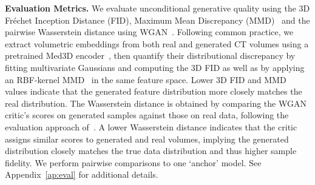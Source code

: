 \textbf{Evaluation Metrics.}\;\; We evaluate unconditional generative quality using the 3D Fréchet Inception Distance (FID),
Maximum Mean Discrepancy (MMD)~\citep{gretton2012kernel,sun2022hierarchical} and the pairwise Wasserstein distance using WGAN~\citep{Arjovsky2017WassersteinG,zhang2025tcam}. Following common practice, we extract volumetric embeddings from both real and generated CT volumes using a pretrained Med3D encoder~\citep{chen2019med3d}, then quantify their distributional discrepancy by fitting multivariate Gaussians and computing the 3D FID as well as by applying an RBF‐kernel MMD~\citep{gretton2012kernel} in the same feature space. Lower 3D FID and MMD values indicate that the generated feature distribution more closely matches the real distribution. The Wasserstein distance is obtained by comparing the WGAN critic’s scores on generated samples against those on real data, following the evaluation approach of~\citet{zhang2025tcam}. A lower Wasserstein distance indicates that the critic assigns similar scores to generated and real volumes, implying the generated distribution closely matches the true data distribution and thus higher sample fidelity. We perform pairwise comparisons to one `anchor' model. See Appendix~\ref{ap:eval} for additional details.


